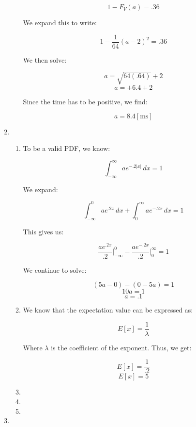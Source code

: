 \begin{enumerate}
\begin{enumerate}
        $$1-F_V(a)=.36$$

        We expand this to write:

        $$1-\frac{1}{64}(a-2)^2=.36$$

        We then solve:

        $$a=\sqrt{64(.64)}+2$$
        $$a=\pm6.4+2$$

        Since the time has to be positive, we find:

        $$\boxed{a=8.4[\si{\milli\second}]}$$

    \end{enumerate}

  \item

    \begin{enumerate}

      \item To be a valid PDF, we know:

        $$\int_{-\infty}^{\infty} ae^{-.2|x|}\,dx=1$$

        We expand:

        $$\int_{-\infty}^{0} ae^{.2x}\,dx+\int_0^{\infty} ae^{-.2x}\,dx=1$$

        This gives us:

        $$ \frac{ae^{.2x}}{.2}\Big|_{-\infty}^0-\frac{ae^{-.2x}}{.2}\Big|_{0}^{\infty}=1$$

        We continue to solve:

        $$(5a-0)-(0-5a)=1$$
        $$10a=1$$
        $$\boxed{a=.1}$$

      \item We know that the expectation value can be expressed as:

        $$E[x]=\frac{1}{\lambda}$$

        Where $\lambda$ is the coefficient of the exponent. Thus, we get:

        $$E[x]=\frac{1}{.2}$$
        $$\boxed{E[x]=5}$$

      \item 

      \item 

      \item 

    \end{enumerate}

  \item

    \begin{enumerate}


\end{enumerate}
\end{enumerate}
